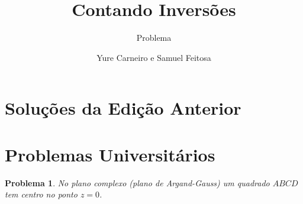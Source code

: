 \documentclass{hipatia}
\subtitle{Problema}
\title{Contando Inversões}
\author{Yure Carneiro e Samuel Feitosa}
\newtheorem{problem*}{Problema}
\begin{document}
\setcounter{page}{\problemapage}
\maketitle



\section{Soluções da Edição Anterior}

\section{Problemas Universitários}

\begin{problem*}
No plano complexo (plano de Argand-Gauss) um 
quadrado $ABCD$ tem centro no ponto $z=0$. 
    \begin{center}

\begin{tikzpicture}[x=0.75pt,y=0.75pt,yscale=-0.6,xscale=0.6]


\end{tikzpicture}
\end{center}
\end{problem*}
\end{document}
